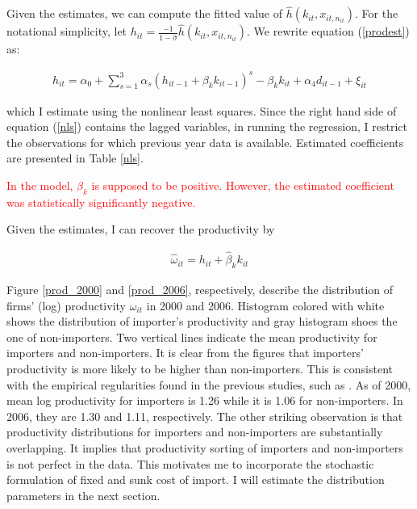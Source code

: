 \documentclass[11pt,letter]{article}
\newcommand{\prn}[1]{\left({#1}\right)}
\begin{document}
\begin{appendices}


Given the estimates, we can compute the fitted value of $\hat{h}(k_{it},x_{it,n_{it}})$. For the notational simplicity, let $h_{it}=\frac{-1}{1-\hat{\sigma}}\hat{h}(k_{it},x_{it,n_{it}})$. We rewrite equation (\ref{prodest}) as:

\begin{align}
 h_{it}  =  \alpha_0 + \sum_{s=1}^3 \alpha_s \prn{ h_{it-1} + \beta_k k_{it-1} }^s - \beta_k k_{it} + \alpha_4 d_{it-1} + \xi_{it} \label{nls}
\end{align}

\noindent which I estimate using the nonlinear least squares. Since the right hand side  of equation (\ref{nls}) contains the lagged variables, in running the regression, I restrict the observations for which previous year data is available. Estimated coefficients are presented in Table \ref{nls}. 

\textcolor{red}{In the model, $\beta_k$ is supposed to be positive. However, the estimated coefficient was statistically significantly negative. }



Given the estimates, I can recover the productivity by

\begin{align}
\hat{\omega}_{it} = h_{it} + \hat{\beta}_k k_{it}
\end{align}

\noindent Figure \ref{prod_2000} and \ref{prod_2006}, respectively, describe the distribution of firms' (log) productivity $\omega_{it}$ in 2000 and 2006. Histogram colored with white shows the distribution of importer's productivity and gray histogram shoes the one of non-importers. Two vertical lines indicate the mean productivity for importers and non-importers. It is clear from the figures that importers' productivity is more likely to be higher than non-importers. This is consistent with the empirical regularities found in the previous studies, such as \citet{Bernard2012}. As of 2000, mean log productivity for importers is 1.26 while it is 1.06 for non-importers. In 2006, they are 1.30 and 1.11, respectively. The other striking observation is that productivity distributions for importers and non-importers are substantially overlapping. It implies that productivity sorting of importers and non-importers is not perfect in the data. This motivates me to incorporate the stochastic formulation of fixed and sunk cost of import. I will estimate the distribution parameters in the next section.


\end{appendices}
\end{document}
